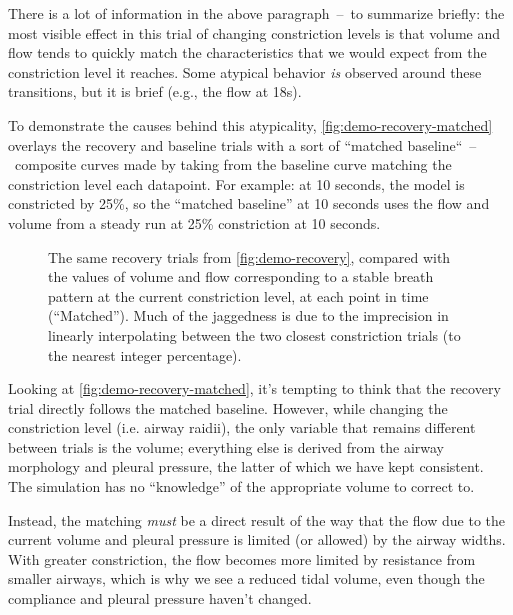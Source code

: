 \breakpars

There is a lot of information in the above paragraph~--~to summarize briefly: the most visible
effect in this trial of changing constriction levels is that volume and flow tends to quickly match
the characteristics that we would expect from the constriction level it reaches. Some atypical
behavior \textit{is} observed around these transitions, but it is brief (e.g., the flow at 18s).

To demonstrate the causes behind this atypicality, \autoref{fig:demo-recovery-matched} overlays the
recovery and baseline trials with a sort of ``matched baseline``~--~composite curves made by taking
from the baseline curve matching the constriction level each datapoint. For example: at 10 seconds,
the model is constricted by 25\%, so the ``matched baseline'' at 10 seconds uses the flow and volume
from a steady run at 25\% constriction at 10 seconds.

\begin{figure}[tp]
    \centering
    \begin{tikzpicture}
        
    \end{tikzpicture}
    \caption{
        The same recovery trials from \autoref{fig:demo-recovery}, compared with the values of
        volume and flow corresponding to a stable breath pattern at the current constriction level,
        at each point in time (``Matched''). Much of the jaggedness is due to the imprecision in
        linearly interpolating between the two closest constriction trials (to the nearest integer
        percentage).
    }
    \label{fig:demo-recovery-matched}
\end{figure}

Looking at \autoref{fig:demo-recovery-matched}, it's tempting to think that the recovery trial
directly follows the matched baseline. However, while changing the constriction level (i.e. airway
raidii), the only variable that remains different between trials is the volume; everything else is
derived from the airway morphology and pleural pressure, the latter of which we have kept
consistent. The simulation has no ``knowledge'' of the appropriate volume to correct to.

Instead, the matching \textit{must} be a direct result of the way that the flow due to the current
volume and pleural pressure is limited (or allowed) by the airway widths. With greater constriction,
the flow becomes more limited by resistance from smaller airways, which is why we see a reduced
tidal volume, even though the compliance and pleural pressure haven't changed.

